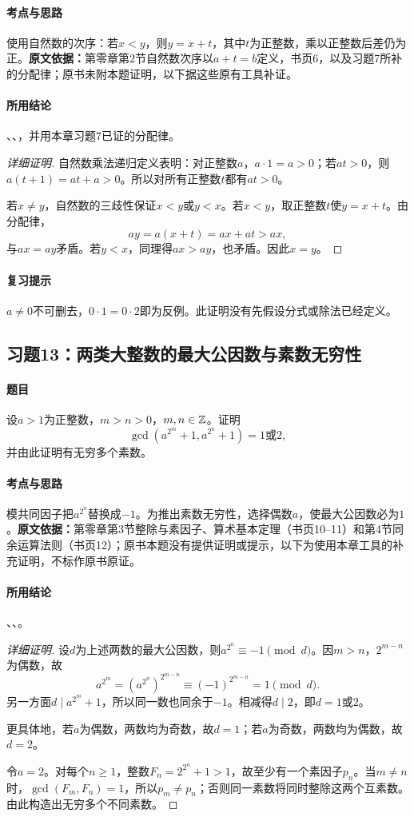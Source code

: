 \paragraph{考点与思路}使用自然数的次序：若$x<y$，则$y=x+t$，其中$t$为正整数，乘以正整数后差仍为正。\textbf{原文依据：}第零章第2节自然数次序以$a+t=b$定义，书页6，以及习题7所补的分配律；原书未附本题证明，以下据这些原有工具补证。
\paragraph{所用结论}、、，并用本章习题7已证的分配律。
\begin{proof}[详细证明]
自然数乘法递归定义表明：对正整数$a$，$a\cdot1=a>0$；若$at>0$，则$a(t+1)=at+a>0$。所以对所有正整数$t$都有$at>0$。

若$x\ne y$，自然数的三歧性保证$x<y$或$y<x$。若$x<y$，取正整数$t$使$y=x+t$。由分配律，
\[
ay=a(x+t)=ax+at>ax,
\]
与$ax=ay$矛盾。若$y<x$，同理得$ax>ay$，也矛盾。因此$x=y$。
\end{proof}
\paragraph{复习提示}$a\ne0$不可删去，$0\cdot1=0\cdot2$即为反例。此证明没有先假设分式或除法已经定义。

\subsection{习题13：两类大整数的最大公因数与素数无穷性}\label{exercise:0:13}
\paragraph{题目}设$a>1$为正整数，$m>n>0$，$m,n\in\mathbb Z$。证明
\[
\gcd(a^{2^m}+1,a^{2^n}+1)=1\text{或}2,
\]
并由此证明有无穷多个素数。
\paragraph{考点与思路}模共同因子把$a^{2^n}$替换成$-1$。为推出素数无穷性，选择偶数$a$，使最大公因数必为$1$。\textbf{原文依据：}第零章第3节整除与素因子、算术基本定理（书页10--11）和第4节同余运算法则（书页12）；原书本题没有提供证明或提示，以下为使用本章工具的补充证明，不标作原书原证。
\paragraph{所用结论}、、。
\begin{proof}[详细证明]
设$d$为上述两数的最大公因数，则$a^{2^n}\equiv-1\pmod d$。因$m>n$，$2^{m-n}$为偶数，故
\[
a^{2^m}=(a^{2^n})^{2^{m-n}}\equiv(-1)^{2^{m-n}}=1\pmod d.
\]
另一方面$d\mid a^{2^m}+1$，所以同一数也同余于$-1$。相减得$d\mid2$，即$d=1$或$2$。

更具体地，若$a$为偶数，两数均为奇数，故$d=1$；若$a$为奇数，两数均为偶数，故$d=2$。

令$a=2$。对每个$n\geq1$，整数$F_n=2^{2^n}+1>1$，故至少有一个素因子$p_n$。当$m\ne n$时，$\gcd(F_m,F_n)=1$，所以$p_m\ne p_n$；否则同一素数将同时整除这两个互素数。由此构造出无穷多个不同素数。
\end{proof}
